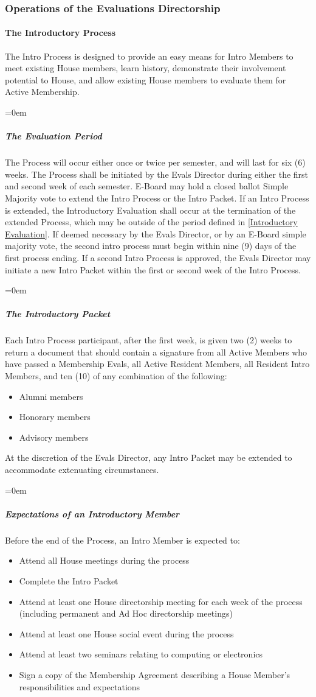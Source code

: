 \documentclass{article}
\newcommand{\asubsection}[1]{\subsubsection{#1} \label{#1}}
\newcommand{\asubsubsection}[1]{\paragraph{#1} \label{#1}}
\newcommand{\asubsubsubsection}[1]{\parindent=0em\subparagraph{#1} \label{#1}}
\begin{document}
\asubsection{Operations of the Evaluations Directorship}

\asubsubsection{The Introductory Process}
The Intro Process is designed to provide an easy means for Intro Members to meet existing House members, learn history, demonstrate their involvement potential to House, and allow existing House members to evaluate them for Active Membership.

\asubsubsubsection{The Evaluation Period}
The Process will occur either once or twice per semester, and will last for six (6) weeks.
The Process shall be initiated by the Evals Director during either the first and second week of each semester.
E-Board may hold a closed ballot Simple Majority vote to extend the Intro Process or the Intro Packet.
If an Intro Process is extended, the Introductory Evaluation shall occur at the termination of the extended Process, which may be outside of the period defined in \ref{Introductory Evaluation}.
If deemed necessary by the Evals Director, or by an E-Board simple majority vote, the second intro process must begin within nine (9) days of the first process ending.
If a second Intro Process is approved, the Evals Director may initiate a new Intro Packet within the first or second week of the Intro Process.

\asubsubsubsection{The Introductory Packet}
Each Intro Process participant, after the first week, is given two (2) weeks to return a document that should contain a signature from all Active Members who have passed a Membership Evals, all Active Resident Members, all Resident Intro Members, and ten (10) of any combination of the following:
\begin{itemize}
	\item Alumni members
	\item Honorary members
	\item Advisory members
\end{itemize}
At the discretion of the Evals Director, any Intro Packet may be extended to accommodate extenuating circumstances.

\asubsubsubsection{Expectations of an Introductory Member}
Before the end of the Process, an Intro Member is expected to:
\begin{itemize}
\item Attend all House meetings during the process
\item Complete the Intro Packet
\item Attend at least one House directorship meeting for each week of the process (including permanent and Ad Hoc directorship meetings)
\item Attend at least one House social event during the process
\item Attend at least two seminars relating to computing or electronics
\item Sign a copy of the Membership Agreement describing a House Member’s responsibilities and expectations
\end{itemize}
\end{document}
